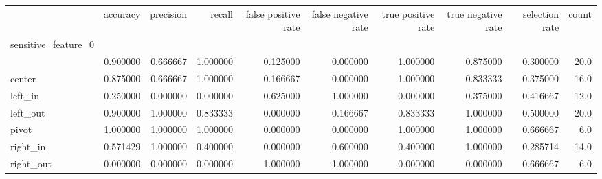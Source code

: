 \begin{tabular}{lrrrrrrrrr}
\toprule
{} &  accuracy &  precision &    recall &  false positive rate &  false negative rate &  true positive rate &  true negative rate &  selection rate &  count \\
sensitive\_feature\_0 &           &            &           &                      &                      &                     &                     &                 &        \\
\midrule
                    &  0.900000 &   0.666667 &  1.000000 &             0.125000 &             0.000000 &            1.000000 &            0.875000 &        0.300000 &   20.0 \\
center              &  0.875000 &   0.666667 &  1.000000 &             0.166667 &             0.000000 &            1.000000 &            0.833333 &        0.375000 &   16.0 \\
left\_in             &  0.250000 &   0.000000 &  0.000000 &             0.625000 &             1.000000 &            0.000000 &            0.375000 &        0.416667 &   12.0 \\
left\_out            &  0.900000 &   1.000000 &  0.833333 &             0.000000 &             0.166667 &            0.833333 &            1.000000 &        0.500000 &   20.0 \\
pivot               &  1.000000 &   1.000000 &  1.000000 &             0.000000 &             0.000000 &            1.000000 &            1.000000 &        0.666667 &    6.0 \\
right\_in            &  0.571429 &   1.000000 &  0.400000 &             0.000000 &             0.600000 &            0.400000 &            1.000000 &        0.285714 &   14.0 \\
right\_out           &  0.000000 &   0.000000 &  0.000000 &             1.000000 &             1.000000 &            0.000000 &            0.000000 &        0.666667 &    6.0 \\
\bottomrule
\end{tabular}
